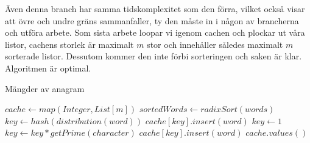 \documentclass[a4paper,11pt,twoside]{article}
\begin{document}
Även denna branch har samma tidskomplexitet som den förra, vilket också visar att övre och undre gräns sammanfaller, ty den måste in i någon av brancherna och utföra arbete. Som sista arbete loopar vi igenom cachen och plockar ut våra listor, cachens storlek är maximalt $m$ stor och innehåller således maximalt $m$ sorterade listor. Dessutom kommer den inte förbi sorteringen och saken är klar. Algoritmen är optimal.
\begin{algorithm}
\caption{Mängder av anagram}
\begin{algorithmic}[1]


  \State $cache \gets map(Integer,List[m])$
  \State $sortedWords \gets radixSort(words)$ 
   
    \State $key \gets hash(distribution(word))$ 
      \State $cache[key].insert(word)$ 
    \Else
      \State $key \gets 1$
       
        \State $key \gets key * getPrime(character)$ 
      \EndFor
      \State $cache[key].insert(word)$ 
    \EndIf
  \EndFor
  \State \Return $cache.values()$ 
\EndFunction
\end{algorithmic}
\end{algorithm}
\end{document}
